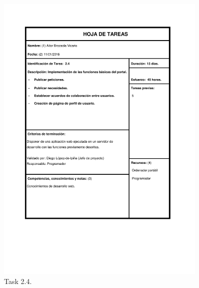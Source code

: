 \documentclass{DeustoFDP}
\begin{document}
\begin{figure}[H]
	\centering
	\includegraphics[width=0.9\textwidth]{fig/Tareas/24}
	\caption{Task 2.4.}
	\label{fig:t24}
\end{figure}
\end{document}
